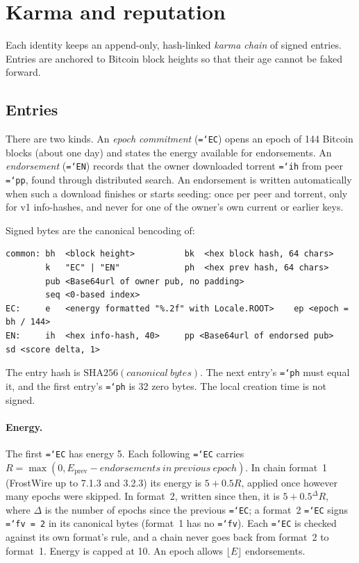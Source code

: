 \documentclass[11pt,a4paper]{article}
\newcommand{\code}[1]{\texttt{\hyphenchar\font=`\-\relax #1}}
\DeclareRobustCommand{\_}{\origunderscore\allowbreak}
\begin{document}
\section{Karma and reputation}
\label{sec:karma}

Each identity keeps an append-only, hash-linked \emph{karma chain} of signed entries. Entries
are anchored to Bitcoin block heights so that their age cannot be faked forward.

\subsection{Entries}
There are two kinds. An \emph{epoch commitment} (\code{EC}) opens an epoch of 144 Bitcoin
blocks (about one day) and states the energy available for endorsements. An
\emph{endorsement} (\code{EN}) records that the owner downloaded torrent \code{ih} from peer
\code{pp}, found through distributed search. An endorsement is written automatically when such
a download finishes or starts seeding: once per peer and torrent, only for v1 info-hashes, and
never for one of the owner's own current or earlier keys.

Signed bytes are the canonical bencoding of:
\begin{lstlisting}
common: bh  <block height>          bk  <hex block hash, 64 chars>
        k   "EC" | "EN"             ph  <hex prev hash, 64 chars>
        pub <Base64url of owner pub, no padding>
        seq <0-based index>
EC:     e   <energy formatted "%.2f" with Locale.ROOT>    ep <epoch = bh / 144>
EN:     ih  <hex info-hash, 40>     pp <Base64url of endorsed pub>   sd <score delta, 1>
\end{lstlisting}
The entry hash is $\mathrm{SHA256}(\mathit{canonical\ bytes})$. The next entry's \code{ph}
must equal it, and the first entry's \code{ph} is 32 zero bytes. The local creation time is
not signed.

\paragraph{Energy.} The first \code{EC} has energy 5. Each following \code{EC} carries
$R = \max(0, E_{\mathrm{prev}} - \mathit{endorsements\ in\ previous\ epoch})$. In chain
format~1 (FrostWire up to 7.1.3 and 3.2.3) its energy is $5 + 0.5 R$, applied once however
many epochs were skipped. In format~2, written since then, it is $5 + 0.5^{\Delta} R$, where
$\Delta$ is the number of epochs since the previous \code{EC}; a format~2 \code{EC} signs
\code{fv = 2} in its canonical bytes (format~1 has no \code{fv}). Each \code{EC} is checked
against its own format's rule, and a chain never goes back from format~2 to format~1. Energy is
capped at 10. An epoch allows $\lfloor E \rfloor$ endorsements.
\end{document}
